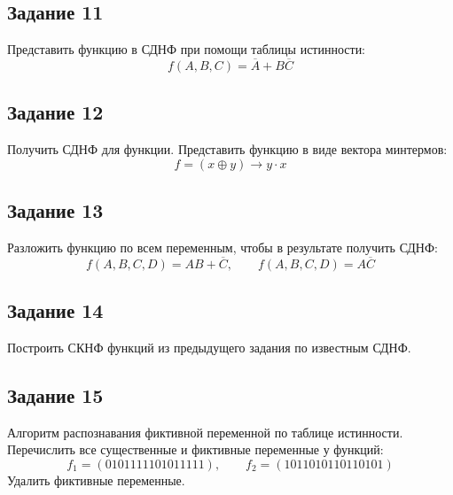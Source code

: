 \documentclass[a4paper,12pt,oneside]{article}
\newcommand{\Task}[1]{%
  \subsection*{#1}%
  \vspace{-0.2\baselineskip}%
}
\begin{document}
\Task{Задание 11}
Представить функцию в СДНФ при помощи таблицы истинности:
\[
f(A,B,C)=\overline{A}+B\overline{C}
\]

\Task{Задание 12}
Получить СДНФ для функции. Представить функцию в виде вектора минтермов:
\[
f=(x\oplus y)\to y\cdot x
\]

\Task{Задание 13}
Разложить функцию по всем переменным, чтобы в результате получить СДНФ:
\[
f(A,B,C,D)=AB+\overline{C},\qquad f(A,B,C,D)=A\overline{C}
\]

\Task{Задание 14}
Построить СКНФ функций из предыдущего задания по известным СДНФ.

\Task{Задание 15}
Алгоритм распознавания фиктивной переменной по таблице истинности. Перечислить все существенные и фиктивные переменные у функций:
\[
f_1=(0101111101011111),\qquad f_2=(1011010110110101)
\]
Удалить фиктивные переменные.
\end{document}
